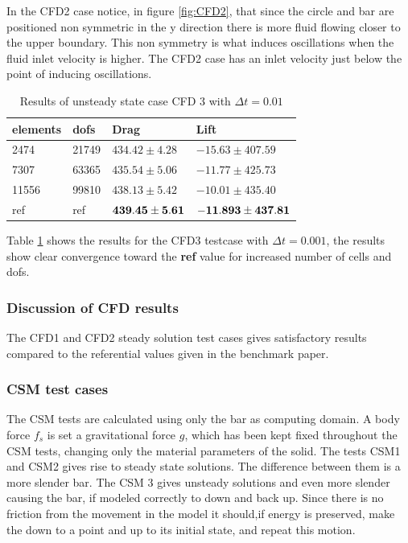 In the CFD2 case notice, in figure \ref{fig:CFD2}, that since the circle and bar are positioned non symmetric in the y direction there is more fluid flowing closer to the upper boundary. This non symmetry is what induces oscillations when the fluid inlet velocity is higher. The CFD2 case has an inlet velocity just below the point of inducing oscillations.

\begin{table}[H]
\centering
\caption{Results of unsteady state case CFD 3 with $\Delta t = 0.01$}
\label{CFD3_dt001}
\begin{tabular}{|l|l|l|l|}
\hline
\textbf{elements} & \textbf{dofs} & \textbf{Drag} & \textbf{Lift} \\ \hline
2474 & 21749 & $434.42 \pm 4.28$ & $-15.63 \pm 407.59$ \\ \hline
7307 & 63365 & $435.54 \pm 5.06$ & $-11.77 \pm 425.73$ \\ \hline
11556 & 99810 & $438.13 \pm 5.42$ & $ -10.01 \pm 435.40 $ \\ \hline
ref & ref & $\bold{439.45} \pm \bold{5.61 }$ & $\bold{ -11.893} \pm \bold{437.81 }$ \\ \hline
\end{tabular}
\end{table}

Table \ref{CFD3_dt001} shows the results for the CFD3 testcase with $\Delta t = 0.001$, the results show clear convergence toward the \textbf{ref} value for increased number of cells and dofs.

\subsubsection{Discussion of CFD results}
The CFD1 and CFD2 steady solution test cases gives satisfactory results compared to the referential values given in the benchmark paper.

\subsubsection{CSM test cases}
The CSM tests are calculated using only the bar as computing domain. A body force $f_s$ is set a gravitational force $g$, which has been kept fixed throughout the CSM tests, changing only the material parameters of the solid. The tests CSM1 and CSM2 gives rise to steady state solutions. The difference between them is a more slender bar. The CSM 3 gives unsteady solutions and even more slender causing the bar, if modeled correctly to down and back up. Since there is no friction from the movement in the model it should,if energy is preserved, make the down to a point and up to its initial state, and repeat this motion. 

